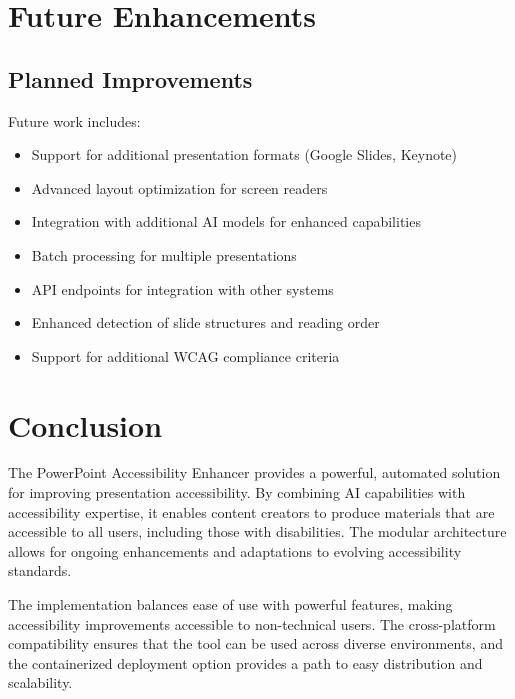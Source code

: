 \documentclass{article}
\begin{document}
\section{Future Enhancements}

\subsection{Planned Improvements}
Future work includes:
\begin{itemize}
    \item Support for additional presentation formats (Google Slides, Keynote)
    \item Advanced layout optimization for screen readers
    \item Integration with additional AI models for enhanced capabilities
    \item Batch processing for multiple presentations
    \item API endpoints for integration with other systems
    \item Enhanced detection of slide structures and reading order
    \item Support for additional WCAG compliance criteria
\end{itemize}

\section{Conclusion}
The PowerPoint Accessibility Enhancer provides a powerful, automated solution for improving presentation accessibility. By combining AI capabilities with accessibility expertise, it enables content creators to produce materials that are accessible to all users, including those with disabilities. The modular architecture allows for ongoing enhancements and adaptations to evolving accessibility standards.

The implementation balances ease of use with powerful features, making accessibility improvements accessible to non-technical users. The cross-platform compatibility ensures that the tool can be used across diverse environments, and the containerized deployment option provides a path to easy distribution and scalability.
\end{document}
